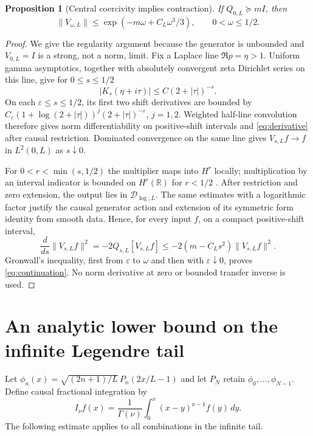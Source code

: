 \documentclass[11pt]{article}
\numberwithin{equation}{section}
\newtheorem{proposition}[theorem]{Proposition}
\theoremstyle{definition}
\theoremstyle{remark}
\newcommand{\DD}{\mathcal D}
\newcommand{\RR}{\mathbb R}
\newcommand{\norm}[1]{\lVert#1\rVert}
\begin{document}
\begin{proposition}[Central coercivity implies contraction]\label{prop:continuation}
If $Q_{0,L}\succeq mI$, then
\begin{equation}\label{eq:continuation}
 \norm{V_{\omega,L}}\le
 \exp(-m\omega+C_L\omega^3/3),\qquad 0<\omega\le1/2.
\end{equation}
\end{proposition}
\begin{proof}
We give the regularity argument because the generator is unbounded and
$V_{0,L}=I$ is a strong, not a norm, limit. Fix a Laplace line $\Re p=\eta>1$.
Uniform gamma asymptotics, together with absolutely convergent zeta Dirichlet
series on this line, give for $0\le s\le1/2$
\[
 |K_s(\eta+i\tau)|\le C(2+|\tau|)^{-s}.
\]
On each $\varepsilon\le s\le1/2$, its first two shift derivatives are
bounded by $C_\varepsilon(1+\log(2+|\tau|))^j(2+|\tau|)^{-\varepsilon}$,
$j=1,2$. Weighted half-line convolution therefore gives norm
differentiability on positive-shift intervals and
\eqref{eq:derivative} after causal restriction. Dominated convergence on
the same line gives $V_{s,L}f\to f$ in $L^2(0,L)$ as $s\downarrow0$.

For $0<r<\min(s,1/2)$ the multiplier maps into $H^r$ locally; multiplication
by an interval indicator is bounded on $H^r(\RR)$ for $r<1/2$
\cite{Strichartz1967}. After restriction and zero extension, the output lies
in $\DD_{\log,L}$. The same estimates with a logarithmic factor justify the
causal generator action and extension of its symmetric form identity from
smooth data. Hence, for every input $f$, on a compact positive-shift interval,
\[
 \frac{d}{ds}\norm{V_{s,L}f}^2
 =-2Q_{s,L}[V_{s,L}f]
 \le-2(m-C_Ls^2)\norm{V_{s,L}f}^2.
\]
Gronwall's inequality, first from $\varepsilon$ to $\omega$ and then with
$\varepsilon\downarrow0$, proves \eqref{eq:continuation}. No norm derivative
at zero or bounded transfer inverse is used.
\end{proof}

\section{An analytic lower bound on the infinite Legendre tail}\label{sec:tail}

Let $\phi_n(x)=\sqrt{(2n+1)/L}\,P_n(2x/L-1)$ and let $P_N$ retain
$\phi_0,\ldots,\phi_{N-1}$. Define causal fractional integration by
\[
 I_\nu f(x)=\frac1{\Gamma(\nu)}\int_0^x(x-y)^{\nu-1}f(y)\,dy.
\]
The following estimate applies to all combinations in the infinite tail.
\end{document}
